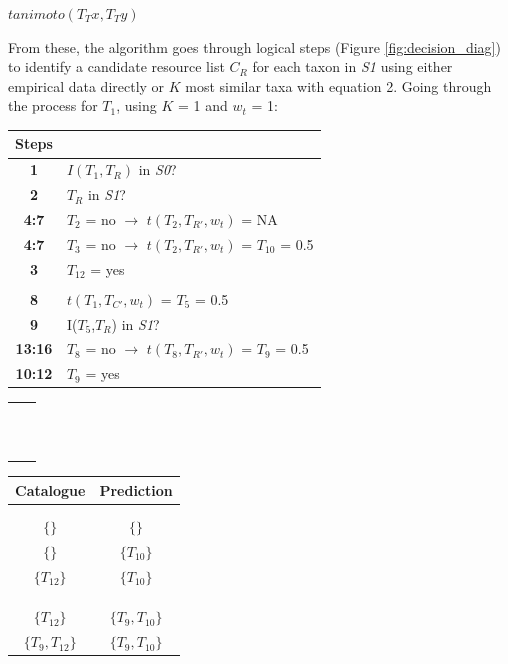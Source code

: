 \documentclass[letterpaper]{article}
\begin{document}
    \centerline{$tanimoto(T_Tx, T_Ty)$}
\bigskip

From these, the algorithm goes through logical steps (Figure \ref{fig:decision_diag}) to identify a candidate resource list $C_R$ for each taxon in \textit{S1} using either empirical data directly or $K$ most similar taxa with equation 2. Going through the process for $T_1$, using $K$ = 1 and $w_t$ = 1:
\bigskip

\begin{table}[h!]
  \centering
  \small
  \begin{tabular}{cl}
      Steps \\
      \hline
      \textbf{1}        &$I(T_1,T_R)$ in \textit{S0}? \\
      \textbf{2}        &$T_R$ in \textit{S1}? \\
      \textbf{4:7}      &$T_2$ = no $\rightarrow$ $t(T_2, T_{R'}, w_t)$ = NA   \\
      \textbf{4:7}      &$T_3$ = no $\rightarrow$ $t(T_2, T_{R'}, w_t)$ = $T_{10}$ = 0.5 \\
      \textbf{3}        &$T_{12}$ = yes    \\  \\
      \textbf{8}        &$t(T_1, T_{C'}, w_t)$ = $T_5$ = 0.5            \\
      \textbf{9}        &I($T_5$,$T_R$) in \textit{S1}? \\
      \textbf{13:16}    &$T_8$ = no $\rightarrow$ $t(T_8, T_{R'}, w_t)$ = $T_9$ = 0.5  \\
      \textbf{10:12}    &$T_9$ = yes   \\
  \end{tabular}
  \begin{tabular}{c|c}
     & \\  \\  \\  \\  \\  \\  \\  \\  \\  \\  \\
  \end{tabular}
  \begin{tabular}{cc}
      Catalogue   & Prediction \\
      \hline \\ \\
      $\{\}$    & $\{\}$            \\
      $\{\}$    & $\{T_{10}\}$      \\
      $\{T_{12}\}$    & $\{T_{10}\}$      \\  \\  \\ \\
      $\{T_{12}\}$    & $\{T_9, T_{10}\}$      \\
      $\{T_9, T_{12}\}$    & $\{T_9, T_{10}\}$      \\
  \end{tabular}
\end{table}
\bigskip
\end{document}

